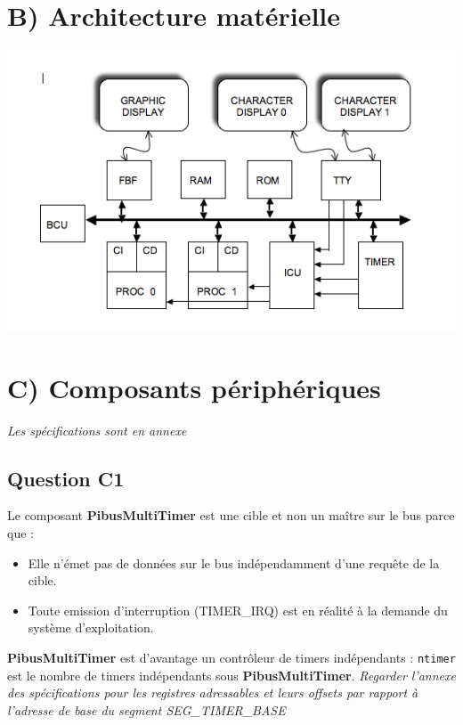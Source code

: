\documentclass[10pt]{article}
\begin{document}
\section{B) Architecture matérielle}
\begin{center}
  \includegraphics[width=14cm]{tp6_topcell.png}
\end{center}

\section{C) Composants périphériques}
{\it Les spécifications sont en annexe}

\subsection{Question C1}
Le composant {\bf PibusMultiTimer} est une cible et non un maître sur le bus
parce que :
\begin{itemize}
  \item Elle n'émet pas de données sur le bus indépendamment d'une requête
  de la cible.
  \item Toute emission d'interruption (TIMER\_IRQ) est en réalité à la demande
  du système d'exploitation.
\end{itemize}
{\bf PibusMultiTimer} est d'avantage un contrôleur de timers indépendants :
\texttt{ntimer} est le nombre de timers indépendants sous {\bf PibusMultiTimer}.
\newline
{\it Regarder l'annexe des spécifications pour les registres adressables et
leurs offsets par rapport à l'adresse de base du segment SEG\_TIMER\_BASE}
\end{document}
